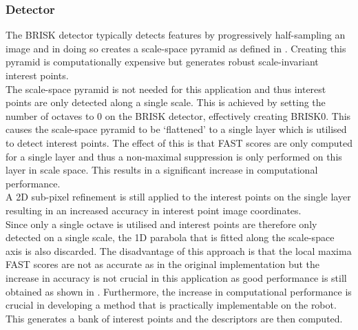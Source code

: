 \documentclass{article}
\begin{document}
\subsubsection{Detector}
\label{sec:BRISK0Detect}
The BRISK detector typically detects features by progressively half-sampling an image and in doing so creates a scale-space pyramid as defined in . Creating this pyramid is computationally expensive but generates robust scale-invariant interest points.\\

The scale-space pyramid is not needed for this application and thus interest points are only detected along a single scale. This is achieved by setting the number of octaves to $0$ on the BRISK detector, effectively creating BRISK0. This causes the scale-space pyramid to be `flattened' to a single layer which is utilised to detect interest points. The effect of this is that FAST scores are only computed for a single layer and thus a non-maximal suppression is only performed on this layer in scale space. This results in a significant increase in computational performance. \\


A 2D sub-pixel refinement is still applied to the interest points on the single layer resulting in an increased accuracy in interest point image coordinates.\\

Since only a single octave is utilised and interest points are therefore only detected on a single scale, the 1D parabola that is fitted along the scale-space axis \cite{Leutenegger2011} is also discarded. The disadvantage of this approach is that the local maxima FAST scores are not as accurate as in the original implementation but the increase in accuracy is not crucial in this application as good performance is still obtained as shown in . Furthermore, the increase in computational performance is crucial in developing a method that is practically implementable on the robot. This generates a bank of interest points and the descriptors are then computed.\\
\end{document}
